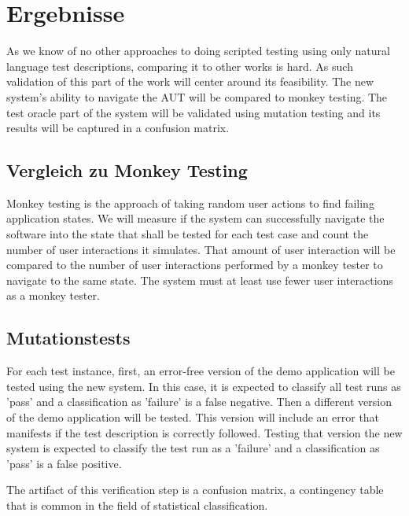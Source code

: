 
\chapter{Ergebnisse}
\label{ch:Results}

As we know of no other approaches to doing scripted testing using only natural language test descriptions, comparing it to other works is hard.
As such validation of this part of the work will center around its feasibility.
The new system's ability to navigate the AUT will be compared to monkey testing.
The test oracle part of the system will be validated using mutation testing and its results will be captured in a confusion matrix.

\section{Vergleich zu Monkey Testing}

Monkey testing is the approach of taking random user actions to find failing application states.
We will measure if the system can successfully navigate the software into the state that shall be tested for each test case and count the number of user interactions it simulates.
That amount of user interaction will be compared to the number of user interactions performed by a monkey tester to navigate to the same state.
The system must at least use fewer user interactions as a monkey tester.

\section{Mutationstests}

For each test instance, first, an error-free version of the demo application will be tested using the new system.
In this case, it is expected to classify all test runs as 'pass' and a classification as 'failure' is a false negative.
Then a different version of the demo application will be tested.
This version will include an error that manifests if the test description is correctly followed.
Testing that version the new system is expected to classify the test run as a 'failure' and a classification as 'pass' is a false positive.

The artifact of this verification step is a confusion matrix, a contingency table that is common in the field of statistical classification.